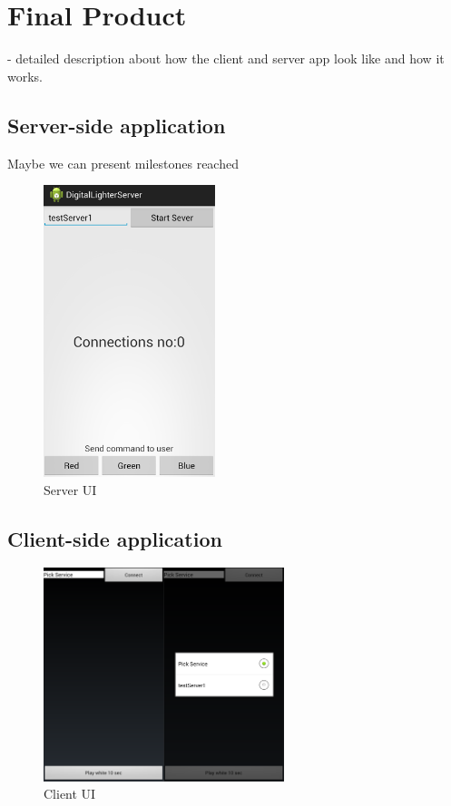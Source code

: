 


\section{Final Product}
- detailed description about how the client and server app look like and how it works.

\subsection{Server-side application}

Maybe we can present milestones reached

\begin{figure}[H]
	\centering
		\includegraphics[width=5cm]{conclusion/server_ui.png}
	\caption{Server UI}
	\label{fig:Server_UI }
\end{figure}

\subsection{Client-side application}
\begin{figure}[H]
	\centering
		\includegraphics[width=7cm]{conclusion/user_ui.png}
	\caption{Client UI}
	\label{fig:Client_UI }
\end{figure}

